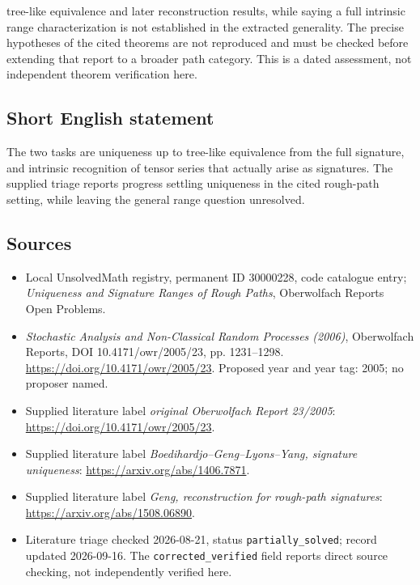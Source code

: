 \documentclass[11pt]{article}
\begin{document}
tree-like equivalence and later reconstruction results, while saying a full intrinsic range characterization is not established in the extracted generality. The precise hypotheses of the cited theorems are not reproduced and must be checked before extending that report to a broader path category. This is a dated assessment, not independent theorem verification here.
\subsection{Short English statement}
The two tasks are uniqueness up to tree-like equivalence from the full signature, and intrinsic recognition of tensor series that actually arise as signatures. The supplied triage reports progress settling uniqueness in the cited rough-path setting, while leaving the general range question unresolved.
\subsection{Sources}
\begin{itemize}\item Local UnsolvedMath registry, permanent ID 30000228, code catalogue entry; \emph{Uniqueness and Signature Ranges of Rough Paths}, Oberwolfach Reports Open Problems.\item \emph{Stochastic Analysis and Non-Classical Random Processes (2006)}, Oberwolfach Reports, DOI 10.4171/owr/2005/23, pp. 1231--1298. \url{https://doi.org/10.4171/owr/2005/23}. Proposed year and year tag: 2005; no proposer named.\item Supplied literature label \emph{original Oberwolfach Report 23/2005}: \url{https://doi.org/10.4171/owr/2005/23}.\item Supplied literature label \emph{Boedihardjo--Geng--Lyons--Yang, signature uniqueness}: \url{https://arxiv.org/abs/1406.7871}.\item Supplied literature label \emph{Geng, reconstruction for rough-path signatures}: \url{https://arxiv.org/abs/1508.06890}.\item Literature triage checked 2026-08-21, status \texttt{partially\_solved}; record updated 2026-09-16. The \texttt{corrected\_verified} field reports direct source checking, not independently verified here.\end{itemize}
\end{document}
